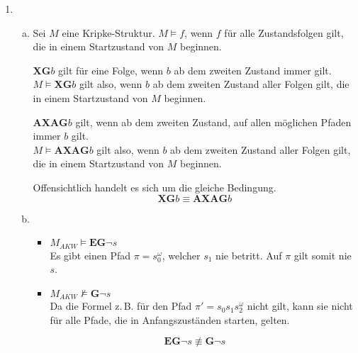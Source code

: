 \documentclass[a4paper]{scrartcl}
\begin{document}
\begin{enumerate}
\begin{enumerate}[(a)]
\begin{itemize}
                \end{itemize}
                
        \end{enumerate}

    \item
        \begin{enumerate}[(a)]
            \item Sei $M$ eine Kripke-Struktur.
                $M \models f$, wenn $f$ für alle Zustandsfolgen gilt, die in
                einem Startzustand von $M$ beginnen.

                $\textbf{XG}b$ gilt für eine Folge, wenn $b$ ab dem zweiten
                Zustand immer gilt. \\
                $M \models \textbf{XG}b$ gilt also, wenn $b$ ab dem zweiten
                Zustand aller Folgen gilt, die in einem Startzustand von $M$
                beginnen.

                $\textbf{AXAG}b$ gilt, wenn ab dem zweiten Zustand, auf allen
                möglichen Pfaden immer $b$ gilt. \\
                $M \models \textbf{AXAG}b$ gilt also, wenn $b$ ab dem zweiten
                Zustand aller Folgen gilt, die in einem Startzustand von $M$
                beginnen.

                Offensichtlich handelt es sich um die gleiche Bedingung.
                \begin{equation*}
                    \textbf{XG}b \equiv \textbf{AXAG}b
                \end{equation*}
                
            \item
                \begin{itemize}
                    \item $M_{AKW} \models \textbf{EG}\lnot s$ \\
                        Es gibt einen Pfad $\pi = s_0^\omega$, welcher $s_1$
                        nie betritt.
                        Auf $\pi$ gilt somit nie $s$.

                    \item $M_{AKW} \not\models \textbf{G}\lnot s$ \\
                        Da die Formel z.\,B. für den Pfad
                        $\pi' = s_0s_1s_2^\omega$ nicht gilt, kann sie nicht für
                        alle Pfade, die in Anfangszuständen starten, gelten.

                \end{itemize}
                \begin{equation*}
                    \textbf{EG}\lnot s \not\equiv \textbf{G}\lnot s
                \end{equation*}
                
        \end{enumerate}

\end{enumerate}
\end{document}
